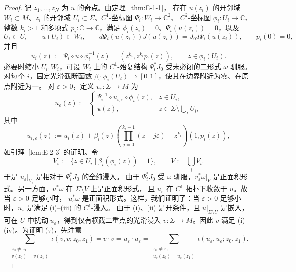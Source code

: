 \begin{proof}
记 $z_1,\ldots,z_N$ 为 $u$ 的奇点。由定理~\ref{thm:E-1-1}，
存在 $u(z_i)$ 的开邻域 $W_i\subset M$、$z_i$ 的开邻域
$U_i\subset\Sigma$、$C^1$-坐标图 $\Psi_i:W_i\to\mathbb C^2$、
$C^2$-坐标图 $\phi_i:U_i\to\mathbb C$、整数 $k_i>1$ 和多项式
$p_i:\mathbb C\to\mathbb C$，满足
$\phi_i(z_i)=0$、$\Psi_i(u(z_i))=0$，以及
\[
  U_i\subset U,\qquad u(U_i)\subset W_i,\qquad
  d\Psi_i(u(z_i))J(u(z_i))=J_0d\Psi_i(u(z_i)),\qquad p_i(0)=0,
\]
并且
\[
  u_i(z):=\Psi_i\circ u\circ\phi_i^{-1}(z)
  =(z^{k_i},z^{k_i}p_i(z)),\qquad z\in\phi_i(U_i).
\]
必要时缩小 $U_i,W_i$，可设 $W_i$ 上的 $C^1$-殆复结构
$\Psi_i^*J_0$ 受未必闭的二形式 $\omega$ 驯服。
对每个 $i$，固定光滑截断函数
$\beta_i:\phi_i(U_i)\to[0,1]$，使其在边界附近为零、在原点附近为一。
对 $\varepsilon>0$，定义 $u_\varepsilon:\Sigma\to M$ 为
\[
  u_\varepsilon(z):=\begin{cases}
    \Psi_i^{-1}\circ u_{i,\varepsilon}\circ\phi_i(z),&z\in U_i,\\
    u(z),&z\in\Sigma\setminus\bigcup_iU_i,
  \end{cases}
\]
其中
\[
  u_{i,\varepsilon}(z):=u_i(z)+\beta_i(z)
    \left(\prod_{j=0}^{k_i-1}(z+j\varepsilon)-z^{k_i}\right)(1,p_i(z)),
\]
如引理~\ref{lem:E-2-3} 的证明。令
\[
  V_i:=\{z\in U_i\mid\beta_i(\phi_i(z))=1\},\qquad
  V:=\bigcup_iV_i.
\]
于是 $u_\varepsilon|_{V_i}$ 是相对于 $\Psi_i^*J_0$ 的全纯浸入。
由于 $\Psi_i^*J_0$ 受 $\omega$ 驯服，$u_\varepsilon^*\omega|_V$
是正面积形式。另一方面，$u^*\omega$ 在 $\Sigma\setminus V$ 上是正面积形式，
且 $u_\varepsilon$ 在 $C^1$ 拓扑下收敛于 $u$。故当 $\varepsilon>0$ 足够小时，
$u_\varepsilon^*\omega$ 是正面积形式。这样，我们证明了：当 $\varepsilon>0$
足够小时，$u_\varepsilon$ 是满足 (i)--(iii) 的 $C^1$-浸入。
由于 (i)、(ii) 是开条件，且 $u|_{\Sigma\setminus U}$ 是嵌入，
可在 $U$ 中扰动 $u_\varepsilon$，得到仅有横截二重点的光滑浸入
$v:\Sigma\to M$。因此 $v$ 满足 (i)--(iv)。为证明 (v)，先注意
\[
  \sum_{\substack{z_0\ne z_1\\v(z_0)=v(z_1)}}
    \iota(v,v;z_0,z_1)
  =v\cdot v=u_\varepsilon\cdot u_\varepsilon
  =\sum_{\substack{z_0\ne z_1\\u_\varepsilon(z_0)=u_\varepsilon(z_1)}}
    \iota(u_\varepsilon,u_\varepsilon;z_0,z_1).
\]


\end{proof}

